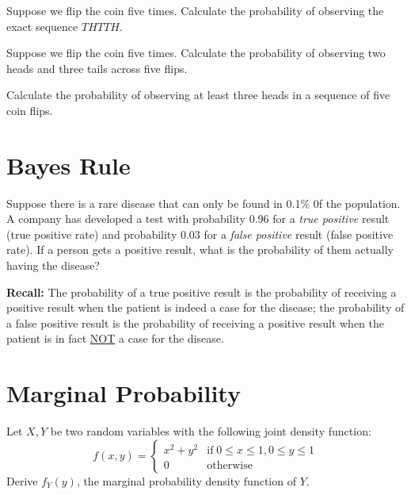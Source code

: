 \documentclass[11pt]{article}
\begin{document}
\item {} Suppose we flip the coin five times. Calculate the probability of observing the exact sequence $THTTH$.
\ifnotsolution{\vspace{4cm}}



\item {} Suppose we flip the coin five times. Calculate the probability of observing two heads and three tails across five flips.
\ifnotsolution{\vspace{4cm}}



\item {} Calculate the probability of observing at least three heads in a sequence of five coin flips.
\ifnotsolution{\clearpage}



\ee



\section{Bayes Rule }
\be
\item {} Suppose there is a rare disease that can only be found in 0.1\% 0f the population. A company has developed a test with probability 0.96 for a \textit{true positive} result (true positive rate) and probability 0.03 for a \textit{false positive} result (false positive rate). If a person gets a positive result, what is the probability of them actually having the disease?

\textbf{Recall:} The probability of a true positive result is the probability of receiving a positive result when the patient is indeed a case for the disease; the probability of a false positive result is the probability of receiving a positive result when the patient is in fact \underline{NOT} a case for the disease.
\ifnotsolution{\vspace{6cm}}


\ee



\section{Marginal Probability }
\be
\item {} Let $X,Y$ be two random variables with the following joint density function:
\begin{equation}
  f(x,y) =
    \begin{cases}
      x^2+y^2 & \text{if} \; 0 \leq x \leq 1, 0 \leq y \leq 1\\
      0 & \text{otherwise}
    \end{cases}       
\end{equation}
Derive $f_Y(y)$, the marginal probability density function of $Y$.
\ifnotsolution{\newpage}
\end{document}
